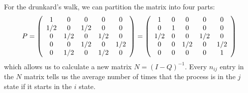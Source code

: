 \documentclass{hw}
\begin{document}
For the drunkard's walk, we can partition the matrix into four parts:
\[
P=
\left(
\begin{array}{c c c c c}
1 & 0 & 0 & 0 & 0\\
1/2 & 0 & 1/2 & 0 & 0\\
0 & 1/2 & 0 & 1/2 & 0\\
0 & 0 & 1/2 & 0 & 1/2\\
0 & 1/2 & 0 & 1/2 & 0
\end{array}
\right)
=
\left(
\begin{array}{c c c c c}
1 & 0 & 0 & 0 & 0\\
0 & 1 & 0 & 0 & 0\\
1/2 & 0 & 0 & 1/2 & 0\\
0 & 0 & 1/2 & 0 & 1/2\\
0 & 0 & 0 & 0 & 1
\end{array}
\right)
\]
which allows us to calculate a new matrix $N=(I-Q)^{-1}$. Every $n_{ij}$ entry in the $N$ matrix
tells us the average number of times that the process is in the $j$ state if it starts in the $i$
state.
\end{document}
